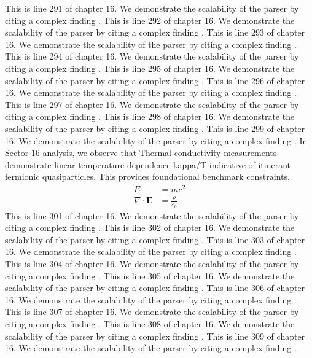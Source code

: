 This is line 291 of chapter 16. We demonstrate the scalability of the parser by citing a complex finding \cite{ref16_291}.
This is line 292 of chapter 16. We demonstrate the scalability of the parser by citing a complex finding \cite{ref16_292}.
This is line 293 of chapter 16. We demonstrate the scalability of the parser by citing a complex finding \cite{ref16_293}.
This is line 294 of chapter 16. We demonstrate the scalability of the parser by citing a complex finding \cite{ref16_294}.
This is line 295 of chapter 16. We demonstrate the scalability of the parser by citing a complex finding \cite{ref16_295}.
This is line 296 of chapter 16. We demonstrate the scalability of the parser by citing a complex finding \cite{ref16_296}.
This is line 297 of chapter 16. We demonstrate the scalability of the parser by citing a complex finding \cite{ref16_297}.
This is line 298 of chapter 16. We demonstrate the scalability of the parser by citing a complex finding \cite{ref16_298}.
This is line 299 of chapter 16. We demonstrate the scalability of the parser by citing a complex finding \cite{ref16_299}.
In Sector 16 analysis, we observe that Thermal conductivity measurements demonstrate linear temperature dependence kappa/T indicative of itinerant fermionic quasiparticles. This provides foundational benchmark constraints.
\begin{align*}
  E &= mc^2 \\
  \nabla \cdot \mathbf{E} &= \frac{\rho}{\varepsilon_0}
\end{align*}
This is line 301 of chapter 16. We demonstrate the scalability of the parser by citing a complex finding \cite{ref16_301}.
This is line 302 of chapter 16. We demonstrate the scalability of the parser by citing a complex finding \cite{ref16_302}.
This is line 303 of chapter 16. We demonstrate the scalability of the parser by citing a complex finding \cite{ref16_303}.
This is line 304 of chapter 16. We demonstrate the scalability of the parser by citing a complex finding \cite{ref16_304}.
This is line 305 of chapter 16. We demonstrate the scalability of the parser by citing a complex finding \cite{ref16_305}.
This is line 306 of chapter 16. We demonstrate the scalability of the parser by citing a complex finding \cite{ref16_306}.
This is line 307 of chapter 16. We demonstrate the scalability of the parser by citing a complex finding \cite{ref16_307}.
This is line 308 of chapter 16. We demonstrate the scalability of the parser by citing a complex finding \cite{ref16_308}.
This is line 309 of chapter 16. We demonstrate the scalability of the parser by citing a complex finding \cite{ref16_309}.
